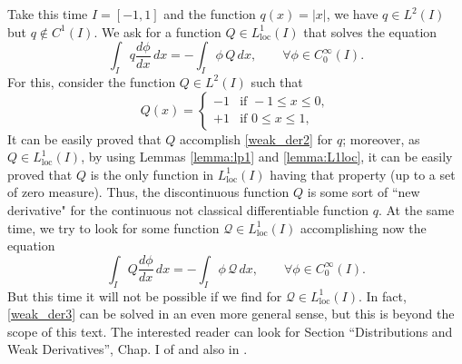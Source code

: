 Take this time $I=[-1,1]$ and the function $q(x)=|x|$, we have $q\in L^2(I)$ but $q\notin C^1(I)$. We ask for a function $Q \in L_\text{loc}^1(I)$ that solves the equation
\begin{equation}
\int_I q\frac{d\phi}{dx}\,dx=-\int_I \phi\,Q\,dx,\qquad \forall \phi \in C_0^\infty(I).\label{eq:weak_der2}
\end{equation}
For this, consider the function $Q\in L^2(I)$ such that 
$$Q(x)=\left\{\begin{array}{ll}
-1 & \text{if }-1\leq x \leq 0, \\
+1 & \text{if }0\leq x \leq 1,
\end{array}\right.$$
It can be easily proved that $Q$ accomplish \eqref{weak_der2} for $q$; moreover, as $Q\in L_\text{loc}^1(I)$, by using Lemmas \ref{lemma:lp1} and \ref{lemma:L1loc}, it can be easily proved that $Q$ is the only function in $L_\text{loc}^1(I)$ having that property (up to a set of zero measure). Thus, the discontinuous function $Q$ is some sort of ``new derivative" for the continuous not classical differentiable function $q$. At the same time, we try to look for some function $\mathcal{Q}\in L_\text{loc}^1(I)$ accomplishing now the equation
\begin{equation}
\int_I Q\frac{d\phi}{dx}\,dx=-\int_I \phi\,\mathcal{Q}\,dx,\qquad \forall \phi \in C_0^\infty(I).\label{eq:weak_der3}
\end{equation}
But this time it will not be possible if we find for $\mathcal{Q}\in L_\text{loc}^1(I)$. In fact, \eqref{weak_der3} can be solved in an even more general sense, but this is beyond the scope of this text. The interested reader can look for Section ``Distributions and Weak Derivatives'', Chap. I of \cite{adams1975} and also in \cite{cordaro2002}.

